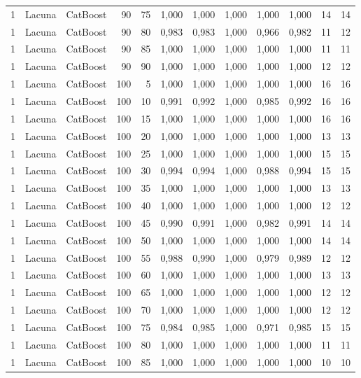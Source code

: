 \begin{longtable}{@{}rllrrrrrrrrr@{}}
1 & Lacuna & CatBoost & 90 & 75 & 1,000 & 1,000 & 1,000 & 1,000 & 1,000 & 14 & 14 \\
1 & Lacuna & CatBoost & 90 & 80 & 0,983 & 0,983 & 1,000 & 0,966 & 0,982 & 11 & 12 \\
1 & Lacuna & CatBoost & 90 & 85 & 1,000 & 1,000 & 1,000 & 1,000 & 1,000 & 11 & 11 \\
1 & Lacuna & CatBoost & 90 & 90 & 1,000 & 1,000 & 1,000 & 1,000 & 1,000 & 12 & 12 \\
1 & Lacuna & CatBoost & 100 & 5 & 1,000 & 1,000 & 1,000 & 1,000 & 1,000 & 16 & 16 \\
1 & Lacuna & CatBoost & 100 & 10 & 0,991 & 0,992 & 1,000 & 0,985 & 0,992 & 16 & 16 \\
1 & Lacuna & CatBoost & 100 & 15 & 1,000 & 1,000 & 1,000 & 1,000 & 1,000 & 16 & 16 \\
1 & Lacuna & CatBoost & 100 & 20 & 1,000 & 1,000 & 1,000 & 1,000 & 1,000 & 13 & 13 \\
1 & Lacuna & CatBoost & 100 & 25 & 1,000 & 1,000 & 1,000 & 1,000 & 1,000 & 15 & 15 \\
1 & Lacuna & CatBoost & 100 & 30 & 0,994 & 0,994 & 1,000 & 0,988 & 0,994 & 15 & 15 \\
1 & Lacuna & CatBoost & 100 & 35 & 1,000 & 1,000 & 1,000 & 1,000 & 1,000 & 13 & 13 \\
1 & Lacuna & CatBoost & 100 & 40 & 1,000 & 1,000 & 1,000 & 1,000 & 1,000 & 12 & 12 \\
1 & Lacuna & CatBoost & 100 & 45 & 0,990 & 0,991 & 1,000 & 0,982 & 0,991 & 14 & 14 \\
1 & Lacuna & CatBoost & 100 & 50 & 1,000 & 1,000 & 1,000 & 1,000 & 1,000 & 14 & 14 \\
1 & Lacuna & CatBoost & 100 & 55 & 0,988 & 0,990 & 1,000 & 0,979 & 0,989 & 12 & 12 \\
1 & Lacuna & CatBoost & 100 & 60 & 1,000 & 1,000 & 1,000 & 1,000 & 1,000 & 13 & 13 \\
1 & Lacuna & CatBoost & 100 & 65 & 1,000 & 1,000 & 1,000 & 1,000 & 1,000 & 12 & 12 \\
1 & Lacuna & CatBoost & 100 & 70 & 1,000 & 1,000 & 1,000 & 1,000 & 1,000 & 12 & 12 \\
1 & Lacuna & CatBoost & 100 & 75 & 0,984 & 0,985 & 1,000 & 0,971 & 0,985 & 15 & 15 \\
1 & Lacuna & CatBoost & 100 & 80 & 1,000 & 1,000 & 1,000 & 1,000 & 1,000 & 11 & 11 \\
1 & Lacuna & CatBoost & 100 & 85 & 1,000 & 1,000 & 1,000 & 1,000 & 1,000 & 10 & 10 \\

\end{longtable}
